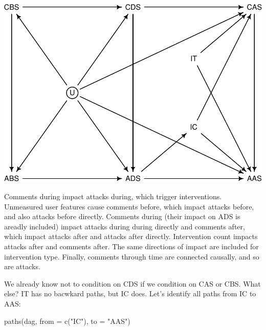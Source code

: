 \documentclass[
  10pt,
  dvipsnames,enabledeprecatedfontcommands]{scrartcl}
\newenvironment{Shaded}{\begin{snugshade}}{\end{snugshade}}
\newcommand{\AttributeTok}[1]{\textcolor[rgb]{0.77,0.63,0.00}{#1}}
\newcommand{\FunctionTok}[1]{\textcolor[rgb]{0.00,0.00,0.00}{#1}}
\newcommand{\NormalTok}[1]{#1}
\newcommand{\StringTok}[1]{\textcolor[rgb]{0.31,0.60,0.02}{#1}}
\begin{document}
\begin{center}\includegraphics[width=0.8\linewidth]{bayesianReport3_files/figure-latex/dag1-1} \end{center}
\normalsize

Comments during impact attacks during, which trigger interventions.
Unmeasured user features cause comments before, which impact attacks
before, and also attacks before directly. Comments during (their impact
on ADS is areadly included) impact attacks during during directly and
comments after, which impact attacks after and attacks after directly.
Intervention count impacts attacks after and comments after. The same
directions of impact are included for intervention type. Finally,
comments through time are connected causally, and so are attacks.

We already know not to condition on CDS if we condition on CAS or CBS.
What else? \textsf{IT} has no bacwkard paths, but \textsf{IC} does.
Let's identify all paths from \textsf{IC} to \textsf{AAS}:

\vspace{1mm}
\footnotesize

\begin{Shaded}
\begin{Highlighting}[]
\FunctionTok{paths}\NormalTok{(dag, }\AttributeTok{from =} \FunctionTok{c}\NormalTok{(}\StringTok{"IC"}\NormalTok{), }\AttributeTok{to =} \StringTok{"AAS"}\NormalTok{)}
\end{Highlighting}
\end{Shaded}
\end{document}
